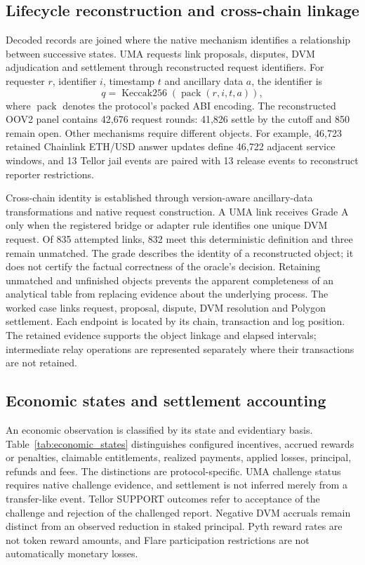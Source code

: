 \subsection{Lifecycle reconstruction and cross-chain linkage}

Decoded records are joined where the native mechanism identifies a relationship between successive states. UMA requests link proposals, disputes, DVM adjudication and settlement through reconstructed request identifiers. For requester $r$, identifier $i$, timestamp $t$ and ancillary data $a$, the identifier is
\begin{equation}
 q = \operatorname{Keccak256}\!\left(\operatorname{pack}(r,i,t,a)\right),
 \label{eq:requestid}
\end{equation}
where $\operatorname{pack}$ denotes the protocol's packed ABI encoding. The reconstructed OOV2 panel contains 42,676 request rounds: 41,826 settle by the cutoff and 850 remain open. Other mechanisms require different objects. For example, 46,723 retained Chainlink ETH/USD answer updates define 46,722 adjacent service windows, and 13 Tellor jail events are paired with 13 release events to reconstruct reporter restrictions.

Cross-chain identity is established through version-aware ancillary-data transformations and native request construction. A UMA link receives Grade A only when the registered bridge or adapter rule identifies one unique DVM request. Of 835 attempted links, 832 meet this deterministic definition and three remain unmatched. The grade describes the identity of a reconstructed object; it does not certify the factual correctness of the oracle's decision. Retaining unmatched and unfinished objects prevents the apparent completeness of an analytical table from replacing evidence about the underlying process. The worked case links request, proposal, dispute, DVM resolution and Polygon settlement. Each endpoint is located by its chain, transaction and log position. The retained evidence supports the object linkage and elapsed intervals; intermediate relay operations are represented separately where their transactions are not retained.

\subsection{Economic states and settlement accounting}

An economic observation is classified by its state and evidentiary basis. Table~\ref{tab:economic_states} distinguishes configured incentives, accrued rewards or penalties, claimable entitlements, realized payments, applied losses, principal, refunds and fees. The distinctions are protocol-specific. UMA challenge status requires native challenge evidence, and settlement is not inferred merely from a transfer-like event. Tellor SUPPORT outcomes refer to acceptance of the challenge and rejection of the challenged report. Negative DVM accruals remain distinct from an observed reduction in staked principal. Pyth reward rates are not token reward amounts, and Flare participation restrictions are not automatically monetary losses.

